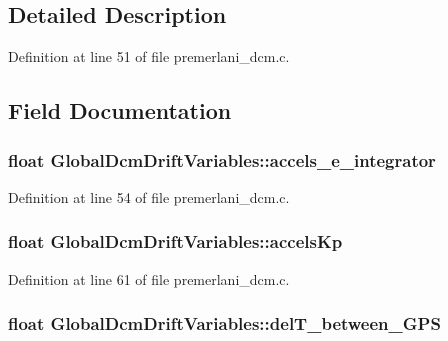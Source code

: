 \subsection{\-Detailed \-Description}


\-Definition at line 51 of file premerlani\-\_\-dcm.\-c.



\subsection{\-Field \-Documentation}
\hypertarget{struct_global_dcm_drift_variables_aacbe312b74443ac8368010f90278706e}{
\subsubsection[{accels\-\_\-e\-\_\-integrator}]{\setlength{\rightskip}{0pt plus 5cm}float {\bf \-Global\-Dcm\-Drift\-Variables\-::accels\-\_\-e\-\_\-integrator}}}\label{struct_global_dcm_drift_variables_aacbe312b74443ac8368010f90278706e}


\-Definition at line 54 of file premerlani\-\_\-dcm.\-c.

\hypertarget{struct_global_dcm_drift_variables_a72471dea4e93a3fa653ba73556b61990}{
\subsubsection[{accels\-Kp}]{\setlength{\rightskip}{0pt plus 5cm}float {\bf \-Global\-Dcm\-Drift\-Variables\-::accels\-Kp}}}\label{struct_global_dcm_drift_variables_a72471dea4e93a3fa653ba73556b61990}


\-Definition at line 61 of file premerlani\-\_\-dcm.\-c.

\hypertarget{struct_global_dcm_drift_variables_a00e780a5b38ecb97c9daccd52b0ef4cf}{
\subsubsection[{del\-T\-\_\-between\-\_\-\-G\-P\-S}]{\setlength{\rightskip}{0pt plus 5cm}float {\bf \-Global\-Dcm\-Drift\-Variables\-::del\-T\-\_\-between\-\_\-\-G\-P\-S}}}\label{struct_global_dcm_drift_variables_a00e780a5b38ecb97c9daccd52b0ef4cf}


